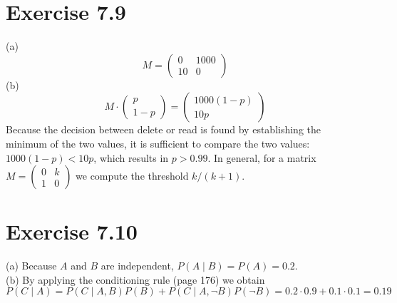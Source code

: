 \documentclass[10pt]{book}
\begin{document}
\section{Exercise 7.9}
(a)
\[
M=\begin{pmatrix}
0 & 1000 \\
10 & 0
\end{pmatrix}
\]
(b)
\[
M \cdot\begin{pmatrix}p\\ 1-p\end{pmatrix}=\begin{pmatrix}1000 (1-p)\\ 10 p\end{pmatrix}
\]
Because the decision between delete or read is found by establishing the minimum of the two values, it is sufficient to compare the two values: $1000(1-p)<10 p$, which results in $p>0.99$. In general, for a matrix $M=\begin{pmatrix}0 & k \\ 1 & 0\end{pmatrix}$ we compute the threshold $k /(k+1)$.

\section{Exercise 7.10}
(a) Because $A$ and $B$ are independent, $P(A \mid B)=P(A)=0.2$.\\
(b) By applying the conditioning rule (page 176) we obtain
\[
P(C \mid A)=P(C \mid A, B) P(B)+P(C \mid A, \neg B) P(\neg B)=0.2 \cdot 0.9+0.1 \cdot 0.1=0.19
\]
\end{document}

